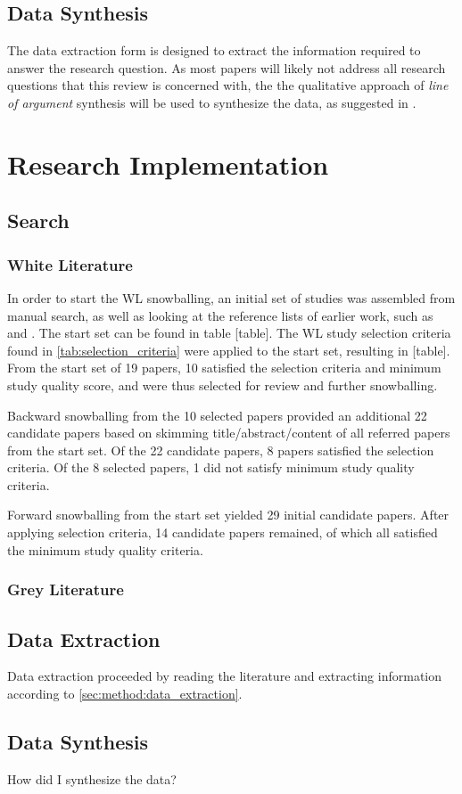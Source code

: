 \subsection{Data Synthesis}
The data extraction form is designed to extract the information required to answer the research question.
As most papers will likely not address all research questions that this review is concerned with, the the qualitative approach of \textit{line of argument} synthesis will be used to synthesize the data, as suggested in \cite{Kitchenham07guidelinesfor}.

\section{Research Implementation}
\label{sec:research_implementation}

\subsection{Search}
\subsubsection{White Literature}
In order to start the WL snowballing, an initial set of studies was assembled from manual search, as well as looking at the reference lists of earlier work, such as \cite{John2021} and \cite{MartinezFernandez2021}.
The start set can be found in table [table].
The WL study selection criteria found in \cref{tab:selection_criteria} were applied to the start set, resulting in [table].
From the start set of 19 papers, 10 satisfied the selection criteria and minimum study quality score, and were thus selected for review and further snowballing.

Backward snowballing from the 10 selected papers provided an additional 22 candidate papers based on skimming title/abstract/content of all referred papers from the start set.
Of the 22 candidate papers, 8 papers satisfied the selection criteria.
Of the 8 selected papers, 1 did not satisfy minimum study quality criteria.

Forward snowballing from the start set yielded 29 initial candidate papers.
After applying selection criteria, 14 candidate papers remained, of which all satisfied the minimum study quality criteria.

\subsubsection{Grey Literature}

\subsection{Data Extraction}
Data extraction proceeded by reading the literature and extracting information according to \cref{sec:method:data_extraction}.

\subsection{Data Synthesis}
How did I synthesize the data?
